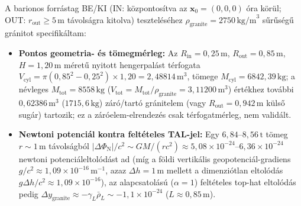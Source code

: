 \documentclass[10pt,a4paper]{article}
\begin{document}
\par
A barionos forr\'astag BE/KI (IN: k\"ozpontos\'itva az $\mathbf{x}_0=(0,0,0)$ \'ora k\"or\"ul; OUT: $r_{\text{out}} \ge 5\,\text{m}$ t\'avols\'agra kitolva) tesztel\'es\'ehez $\rho_{\text{granite}} = 2750\,\text{kg/m}^3$ s\H{u}r\H{u}s\'eg\H{u} gr\'anitot specifik\'altam:
\begin{itemize}\setlength{\itemsep}{1pt}\setlength{\parskip}{0pt}\setlength{\topsep}{1pt}
  \item \textbf{Pontos geometria- \'es t\"omegm\'erleg:} Az $R_{\text{in}} = 0{,}25\,\text{m}$, $R_{\text{out}} = 0{,}85\,\text{m}$, $H = 1{,}20\,\text{m}$ m\'eret\H{u} nyitott hengerpal\'ast t\'erfogata $V_{\text{cyl}} = \pi(0{,}85^2 - 0{,}25^2)\times 1{,}20 = 2{,}48814\,\text{m}^3$, t\"omege \textbf{$M_{\text{cyl}} = 6842{,}39\,\text{kg}$}; a n\'evleges \textbf{$M_{\text{tot}} = 8558\,\text{kg}$} ($V_{\text{tot}} = M_{\text{tot}}/\rho_{\text{granite}} = 3{,}11200\,\text{m}^3$) \'ert\'ekhez tov\'abbi $0{,}62386\,\text{m}^3$ ($1715{,}6\,\text{kg}$) z\'ar\'o/tart\'o gr\'anitelem (vagy $R_{\text{out}} = 0{,}942\,\text{m}$ k\"uls\H{o} sug\'ar) tartozik; ez a z\'ar\'oelem-elrendez\'es csak t\'erfogatm\'erleg, nem valid\'alt.
  \item \textbf{Newtoni potenci\'al kontra felt\'eteles TAL-jel:} Egy $6{,}84$--$8{,}56\,\text{t}$ t\"omeg $r \sim 1\,\text{m}$ t\'avols\'agb\'ol $|\Delta\Phi_{\text{N}}|/c^2 \sim GM/(rc^2) \approx 5{,}08\times 10^{-24}$--$6{,}36\times 10^{-24}$ newtoni potenci\'aleltol\'od\'ast ad (m\'ig a f\"oldi vertik\'alis geopotenci\'al-gradiens $g/c^2 \approx 1{,}09\times 10^{-16}\,\text{m}^{-1}$, azaz $\Delta h = 1\,\text{m}$ mellett a dimenzi\'otlan eltol\'od\'as $g\Delta h/c^2 \approx 1{,}09\times 10^{-16}$), az alapcsatol\'as\'u ($\alpha=1$) felt\'eteles top-hat eltol\'od\'as pedig $\Delta y_{\text{granite}} \approx -\gamma_L\bar{\rho}_L \sim -1{,}1\times 10^{-24}$ ($L \approx 0{,}85\,\text{m}$).
\end{itemize}
\end{document}
